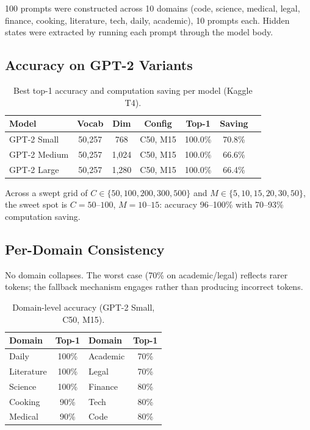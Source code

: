 \documentclass[11pt]{article}
\begin{document}
100 prompts were constructed across 10 domains (code, science, medical, legal, finance, cooking, literature, tech, daily, academic), 10 prompts each. Hidden states were extracted by running each prompt through the model body.

\subsection{Accuracy on GPT-2 Variants}

\begin{table}[h]
\centering
\caption{Best top-1 accuracy and computation saving per model (Kaggle T4).}
\label{tab:accuracy}
\begin{tabular}{lcccccc}
\toprule
Model           & Vocab  & Dim   & Config     & Top-1   & Saving \\
\midrule
GPT-2 Small     & 50{,}257 & 768   & C50, M15   & 100.0\% & 70.8\% \\
GPT-2 Medium    & 50{,}257 & 1{,}024 & C50, M15   & 100.0\% & 66.6\% \\
GPT-2 Large     & 50{,}257 & 1{,}280 & C50, M15   & 100.0\% & 66.4\% \\
\bottomrule
\end{tabular}
\end{table}

Across a swept grid of $C \in \{50, 100, 200, 300, 500\}$ and $M \in \{5, 10, 15, 20, 30, 50\}$, the sweet spot is $C = 50$--$100$, $M = 10$--$15$: accuracy 96--100\% with 70--93\% computation saving.

\subsection{Per-Domain Consistency}

No domain collapses. The worst case (70\% on academic/legal) reflects rarer tokens; the fallback mechanism engages rather than producing incorrect tokens.

\begin{table}[h]
\centering
\caption{Domain-level accuracy (GPT-2 Small, C50, M15).}
\label{tab:domain}
\begin{tabular}{lc|lc}
\toprule
Domain     & Top-1  & Domain   & Top-1  \\
\midrule
Daily      & 100\%  & Academic & 70\%   \\
Literature & 100\%  & Legal    & 70\%   \\
Science    & 100\%  & Finance  & 80\%   \\
Cooking    & 90\%   & Tech     & 80\%   \\
Medical    & 90\%   & Code     & 80\%   \\
\bottomrule
\end{tabular}
\end{table}
\end{document}
